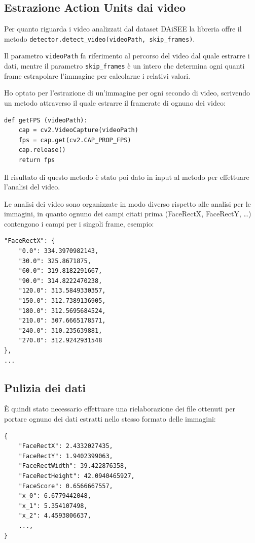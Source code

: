 \subsection{Estrazione Action Units dai video}
Per quanto riguarda i video analizzati dal dataset DAiSEE la libreria offre il metodo \texttt{detector.detect_video(videoPath, skip_frames)}.

Il parametro \texttt{videoPath} fa riferimento al percorso del video dal quale estrarre i dati, mentre il parametro \texttt{skip_frames} è un intero che determina ogni quanti frame estrapolare l’immagine per calcolarne i relativi valori.

Ho optato per l’estrazione di un’immagine per ogni secondo di video, scrivendo un metodo attraverso il quale estrarre il framerate di ognuno dei video:
\begin{verbatim}
def getFPS (videoPath):
    cap = cv2.VideoCapture(videoPath)
    fps = cap.get(cv2.CAP_PROP_FPS)
    cap.release()
    return fps
\end{verbatim}
Il risultato di questo metodo è stato poi dato in input al metodo per effettuare l’analisi del video.

Le analisi dei video sono organizzate in modo diverso rispetto alle analisi per le immagini, in quanto ognuno dei campi citati prima (FaceRectX, FaceRectY, …) contengono i campi per i singoli frame, esempio:
\begin{verbatim}
"FaceRectX": {
    "0.0": 334.3970982143,
    "30.0": 325.8671875,
    "60.0": 319.8182291667,
    "90.0": 314.8222470238,
    "120.0": 313.5849330357,
    "150.0": 312.7389136905,
    "180.0": 312.5695684524,
    "210.0": 307.6665178571,
    "240.0": 310.235639881,
    "270.0": 312.9242931548
},
...
\end{verbatim}

\subsection{Pulizia dei dati}
È quindi stato necessario effettuare una rielaborazione dei file ottenuti per portare ognuno dei dati estratti nello stesso formato delle immagini:
\begin{verbatim}
{
    "FaceRectX": 2.4332027435,
    "FaceRectY": 1.9402399063,
    "FaceRectWidth": 39.422876358,
    "FaceRectHeight": 42.0940465927,
    "FaceScore": 0.6566667557,
    "x_0": 6.6779442048,
    "x_1": 5.354107498,
    "x_2": 4.4593806637,
    ...,
}
\end{verbatim}

